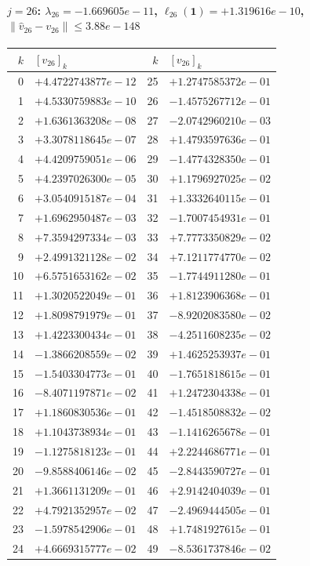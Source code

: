 \documentclass[11pt]{article}
\begin{document}
\paragraph{$j = 26$: $\lambda_{26} = -1.669605e-11$, \quad $\ell_{26}(\mathbf{1}) = +1.319616e-10$, \quad $\|\hat v_{26} - v_{26}\| \leq 3.88e-148$}
\begin{center}
{\footnotesize
\begin{tabular}{r@{\;\;}l@{\quad}r@{\;\;}l}
\toprule
$k$ & $[v_{26}]_k$ & $k$ & $[v_{26}]_k$ \\
\midrule
0 & $+4.4722743877e-12$ & 25 & $+1.2747585372e-01$ \\
1 & $+4.5330759883e-10$ & 26 & $-1.4575267712e-01$ \\
2 & $+1.6361363208e-08$ & 27 & $-2.0742960210e-03$ \\
3 & $+3.3078118645e-07$ & 28 & $+1.4793597636e-01$ \\
4 & $+4.4209759051e-06$ & 29 & $-1.4774328350e-01$ \\
5 & $+4.2397026300e-05$ & 30 & $+1.1796927025e-02$ \\
6 & $+3.0540915187e-04$ & 31 & $+1.3332640115e-01$ \\
7 & $+1.6962950487e-03$ & 32 & $-1.7007454931e-01$ \\
8 & $+7.3594297334e-03$ & 33 & $+7.7773350829e-02$ \\
9 & $+2.4991321128e-02$ & 34 & $+7.1211774770e-02$ \\
10 & $+6.5751653162e-02$ & 35 & $-1.7744911280e-01$ \\
11 & $+1.3020522049e-01$ & 36 & $+1.8123906368e-01$ \\
12 & $+1.8098791979e-01$ & 37 & $-8.9202083580e-02$ \\
13 & $+1.4223300434e-01$ & 38 & $-4.2511608235e-02$ \\
14 & $-1.3866208559e-02$ & 39 & $+1.4625253937e-01$ \\
15 & $-1.5403304773e-01$ & 40 & $-1.7651818615e-01$ \\
16 & $-8.4071197871e-02$ & 41 & $+1.2472304338e-01$ \\
17 & $+1.1860830536e-01$ & 42 & $-1.4518508832e-02$ \\
18 & $+1.1043738934e-01$ & 43 & $-1.1416265678e-01$ \\
19 & $-1.1275818123e-01$ & 44 & $+2.2244686771e-01$ \\
20 & $-9.8588406146e-02$ & 45 & $-2.8443590727e-01$ \\
21 & $+1.3661131209e-01$ & 46 & $+2.9142404039e-01$ \\
22 & $+4.7921352957e-02$ & 47 & $-2.4969444505e-01$ \\
23 & $-1.5978542906e-01$ & 48 & $+1.7481927615e-01$ \\
24 & $+4.6669315777e-02$ & 49 & $-8.5361737846e-02$ \\
\bottomrule
\end{tabular}
}
\end{center}
\end{document}
